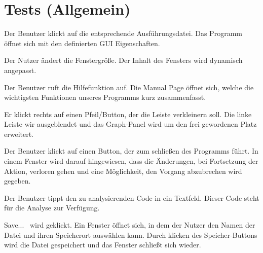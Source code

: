 \section{Tests (Allgemein)}



{Der Benutzer klickt auf die entsprechende Ausführungsdatei.}
{Das Programm öffnet sich mit den definierten GUI Eigenschaften.}

{Der Nutzer ändert die Fenstergröße.}
{Der Inhalt des Fensters wird dynamisch angepasst.}

{Der Benutzer ruft die Hilfefunktion auf.}
{Die Manual Page öffnet sich, welche die wichtigsten Funktionen unseres Programms kurz zusammenfasst.}

{Er klickt rechts auf einen Pfeil/Button, der die Leiste verkleinern soll.}
{Die linke Leiste wir ausgeblendet und das Graph-Panel wird um den frei gewordenen Platz erweitert.}

{Der Benutzer klickt auf einen Button, der zum schließen des Programms führt.}
{In einem Fenster wird darauf hingewiesen, dass die Änderungen, bei Fortsetzung der Aktion, verloren gehen und eine Möglichkeit, den Vorgang abzubrechen wird gegeben.}




{Der Benutzer tippt den zu analysierenden Code in ein Textfeld.}
{Dieser Code steht für die Analyse zur Verfügung.}

{\glqq Save... \grqq\ wird geklickt.}
{Ein Fenster öffnet sich, in dem der Nutzer den Namen der Datei und ihren Speicherort auswählen kann. Durch klicken des \glqq Speicher\grqq -Buttons wird die Datei gespeichert und das Fenster schließt sich wieder.}


